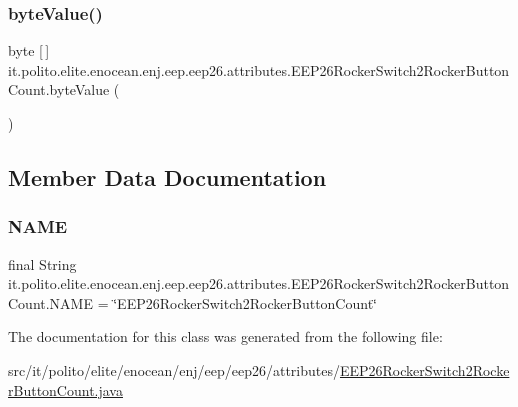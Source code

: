\subsubsection{\texorpdfstring{byte\+Value()}{byteValue()}}
{\footnotesize\ttfamily byte \mbox{[}$\,$\mbox{]} it.\+polito.\+elite.\+enocean.\+enj.\+eep.\+eep26.\+attributes.\+E\+E\+P26\+Rocker\+Switch2\+Rocker\+Button\+Count.\+byte\+Value (\begin{DoxyParamCaption}{ }\end{DoxyParamCaption})}



\subsection{Member Data Documentation}
\hypertarget{classit_1_1polito_1_1elite_1_1enocean_1_1enj_1_1eep_1_1eep26_1_1attributes_1_1_e_e_p26_rocker_switch2_rocker_button_count_a47241a50557270e6aedf63ccd0a3be92}{}\label{classit_1_1polito_1_1elite_1_1enocean_1_1enj_1_1eep_1_1eep26_1_1attributes_1_1_e_e_p26_rocker_switch2_rocker_button_count_a47241a50557270e6aedf63ccd0a3be92} 
\subsubsection{\texorpdfstring{N\+A\+ME}{NAME}}
{\footnotesize\ttfamily final String it.\+polito.\+elite.\+enocean.\+enj.\+eep.\+eep26.\+attributes.\+E\+E\+P26\+Rocker\+Switch2\+Rocker\+Button\+Count.\+N\+A\+ME = \char`\"{}E\+E\+P26\+Rocker\+Switch2\+Rocker\+Button\+Count\char`\"{}\hspace{0.3cm}{\ttfamily [static]}}



The documentation for this class was generated from the following file\+:\begin{DoxyCompactItemize}
\item 
src/it/polito/elite/enocean/enj/eep/eep26/attributes/\hyperlink{_e_e_p26_rocker_switch2_rocker_button_count_8java}{E\+E\+P26\+Rocker\+Switch2\+Rocker\+Button\+Count.\+java}\end{DoxyCompactItemize}
